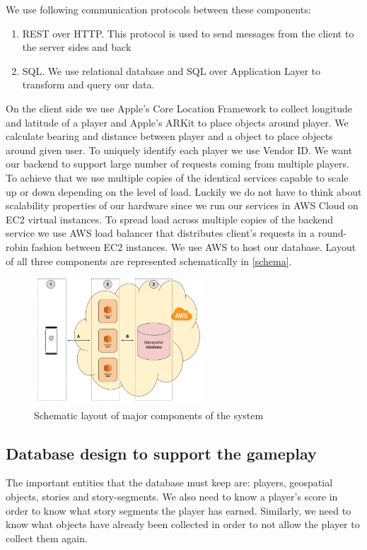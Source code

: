 \documentclass[conference]{IEEEtran}
\begin{document}
We use following communication protocols between these components:

\begin{enumerate}[label=\Alph*]
\item REST over HTTP. This protocol is used to send messages from the client to the server sides and back
\item SQL. We use relational database and SQL over Application Layer to transform and query our data. 
\end{enumerate}

On the client side we use Apple’s Core Location Framework to collect longitude and latitude of a player and Apple’s ARKit to place objects around player. We calculate bearing and distance between player and a object to place objects around given user. To uniquely identify each player we use Vendor ID.
We want our backend to support large number of requests coming from multiple players. To achieve that we use multiple copies of the identical services capable to scale up or down depending on the level of load. Luckily we do not have to think about scalability properties of our hardware since we run our services in AWS Cloud on EC2 virtual instances.  To spread load across multiple copies of the backend service we use AWS load balancer that distributes client’s requests in a round-robin fashion between EC2 instances. 
We use AWS to host our database. 
Layout of all three components are represented schematically in \autoref{schema}. 

\begin{figure}[h]
\centering
\includegraphics[width=2.5in]{imgs/systemschema.png}
\caption{Schematic layout of major components of the system}
\label{schema}
\end{figure}

\subsection{Database design to support the gameplay}

The important entities that the database must keep are: players, geospatial objects, stories and story-segments. We also need to know a player’s score in order to know what story segments the player has earned. Similarly, we need to know what objects have already been collected in order to not allow the player to collect them again. 
\end{document}
